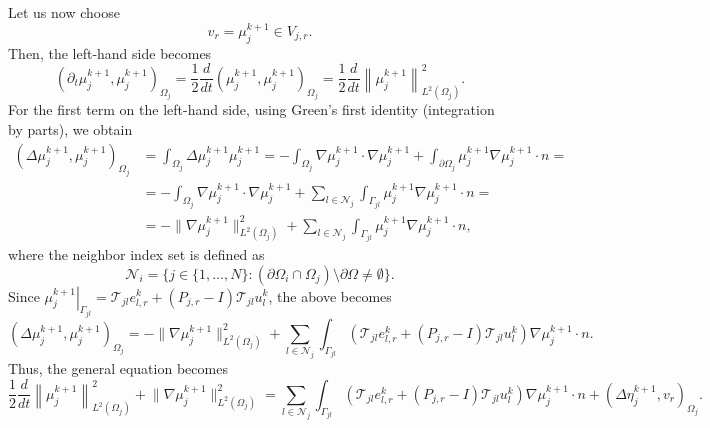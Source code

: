 \documentclass[a4paper, 11pt]{article}
\theoremstyle{plain}
\theoremstyle{definition}
\theoremstyle{remark}
\begin{document}
\noindent Let us now choose
\begin{equation*}
    v_{r} = \mu_{j}^{k+1}\in V_{j, r}.
\end{equation*}
Then, the left-hand side becomes
\begin{equation*}
    \left(\partial_{t}\mu_{j}^{k+1}, \mu_{j}^{k+1}\right)_{\Omega_{j}} = \dfrac{1}{2} \dfrac{d}{dt} \left(\mu_{j}^{k+1}, \mu_{j}^{k+1}\right)_{\Omega_{j}} = \dfrac{1}{2}\dfrac{d}{dt}\left\lVert \mu_{j}^{k+1}\right\rVert^{2}_{L^{2}(\Omega_{j})}.
\end{equation*}
For the first term on the left-hand side, using Green’s first identity (integration by parts), we obtain
\begin{align*}
    \left(\Delta \mu_{j}^{k+1}, \mu_{j}^{k+1}\right)_{\Omega_{j}} &= \int_{\Omega_{j}}\Delta \mu_{j}^{k+1} \mu_{j}^{k+1} = -\int_{\Omega_{j}}\nabla \mu_{j}^{k+1} \cdot \nabla \mu_{j}^{k+1} + \int_{\partial\Omega_{j}}\mu_{j}^{k+1}\nabla\mu_{j}^{k+1}\cdot n=\\
    &= -\int_{\Omega_{j}}\nabla \mu_{j}^{k+1} \cdot \nabla \mu_{j}^{k+1} + \sum_{l\in \mathcal{N}_{j}}\int_{\Gamma_{jl}}\mu_{j}^{k+1}\nabla\mu_{j}^{k+1}\cdot n=\\
    &= -\lVert \nabla \mu_{j}^{k+1}\rVert^{2}_{L^{2}(\Omega_{j})} + \sum_{l\in \mathcal{N}_{j}}\int_{\Gamma_{jl}}\mu_{j}^{k+1}\nabla\mu_{j}^{k+1}\cdot n,
\end{align*}
where the neighbor index set is defined as
\begin{equation*}
    \mathcal{N}_{i} = \{j\in \{1, \ldots, N\}: \left(\partial\Omega_{i}\cap\Omega_{j}\right)\setminus \partial\Omega \neq \emptyset\}.
\end{equation*}
Since $\left.\mu_{j}^{k+1}\right|_{\Gamma_{jl}} = \mathcal{T}_{jl}e_{l, r}^{k} + \left(P_{j, r} -I \right)\mathcal{T}_{jl}u_{l}^{k}$, the above becomes
\begin{equation*}
    \left(\Delta \mu_{j}^{k+1}, \mu_{j}^{k+1}\right)_{\Omega_{j}} = -\lVert \nabla \mu_{j}^{k+1}\rVert^{2}_{L^{2}(\Omega_{j})} + \sum_{l\in \mathcal{N}_{j}}\int_{\Gamma_{jl}}\left(\mathcal{T}_{jl}e_{l, r}^{k} + \left(P_{j, r} -I \right)\mathcal{T}_{jl}u_{l}^{k}\right)\nabla\mu_{j}^{k+1}\cdot n.
\end{equation*}
Thus, the general equation becomes
\begin{equation*}
    \dfrac{1}{2}\dfrac{d}{dt}\left\lVert \mu_{j}^{k+1}\right\rVert^{2}_{L^{2}(\Omega_{j})} + \lVert \nabla \mu_{j}^{k+1}\rVert^{2}_{L^{2}(\Omega_{j})} = \sum_{l\in \mathcal{N}_{j}}\int_{\Gamma_{jl}}\left(\mathcal{T}_{jl}e_{l, r}^{k} + \left(P_{j, r} -I \right)\mathcal{T}_{jl}u_{l}^{k}\right)\nabla\mu_{j}^{k+1}\cdot n + \left(\Delta \eta_{j}^{k+1}, v_{r}\right)_{\Omega_{j}}.
\end{equation*}
\end{document}
